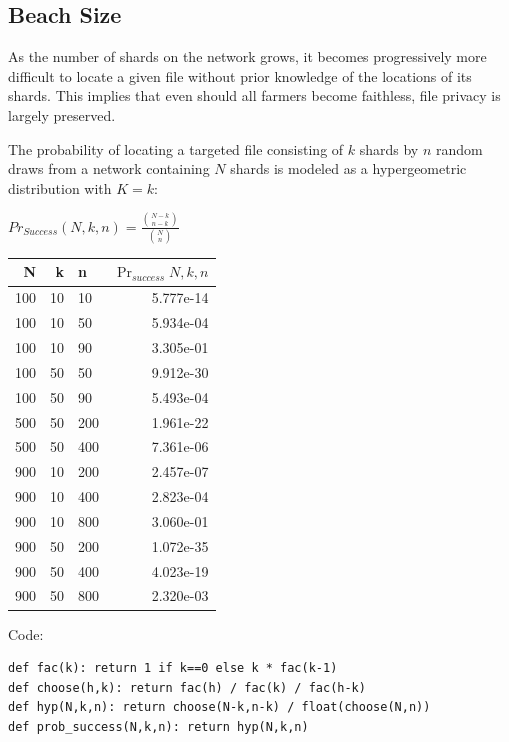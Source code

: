\documentclass[a4paper,10pt]{article}
\begin{document}
\subsection{Beach Size}
As the number of shards on the network grows, it becomes progressively more difficult to locate a given file without prior knowledge of the locations of its shards. This implies that even should all farmers become faithless, file privacy is largely preserved.

The probability of locating a targeted file consisting of $ k $ shards by $ n $ random draws from a network containing $ N $ shards is modeled as a hypergeometric distribution with $ K = k $:

{\centering
$Pr_{Success}(N,k,n) = \displaystyle \frac{{N-k \choose n-k}}{{N \choose n}}$
\\}

\begin{table}[hbt!]
\begin{center}
\begin{tabular}{r r l r}
N & k & n & $\Pr_{success}{N,k,n}$\\
\hline 100 & 10 & 10  & 5.777e-14\\
\hline 100 & 10 & 50  & 5.934e-04\\
\hline 100 & 10 & 90  & 3.305e-01\\
\hline 100 & 50 & 50  & 9.912e-30\\
\hline 100 & 50 & 90  & 5.493e-04\\
\hline 500 & 50 & 200 & 1.961e-22\\
\hline 500 & 50 & 400 & 7.361e-06\\
\hline 900 & 10 & 200 & 2.457e-07\\
\hline 900 & 10 & 400 & 2.823e-04\\
\hline 900 & 10 & 800 & 3.060e-01\\
\hline 900 & 50 & 200 & 1.072e-35\\
\hline 900 & 50 & 400 & 4.023e-19\\
\hline 900 & 50 & 800 & 2.320e-03\\
\end{tabular}
\end{center}
\end{table}

Code:
\begin{lstlisting}
def fac(k): return 1 if k==0 else k * fac(k-1)
def choose(h,k): return fac(h) / fac(k) / fac(h-k)
def hyp(N,k,n): return choose(N-k,n-k) / float(choose(N,n))
def prob_success(N,k,n): return hyp(N,k,n)
\end{lstlisting}
\end{document}
